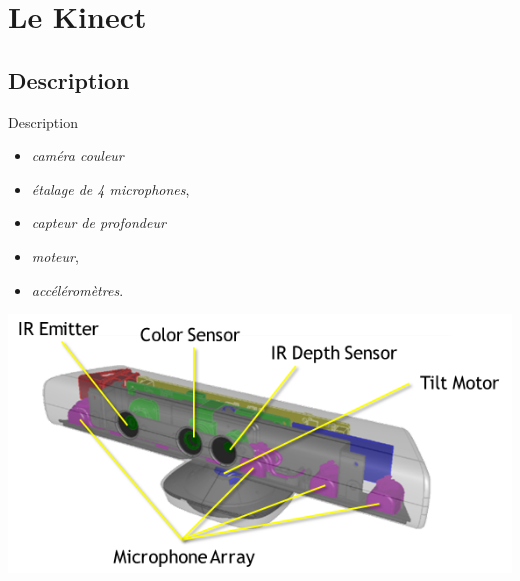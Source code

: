 \section{Le Kinect}

\begin{frame}
\end{frame}

\subsection{Description}
\begin{frame}{Description}
\vfill
\begin{minipage}[t]{0.49\linewidth}
\begin{itemize}
\item<1-> \emph{caméra couleur}
\item<2-> \emph{étalage de 4 microphones},
\end{itemize}
\end{minipage} 
\begin{minipage}[t]{0.49\linewidth}
\begin{itemize}
\item<3-> \emph{capteur de profondeur}
\item<4-> \emph{moteur},
\item<4-> \emph{accéléromètres}.
\end{itemize}
\end{minipage}
\vfill
\centering
\includegraphics[width=0.65\linewidth]{../images/kinect_specs}

\end{frame}

